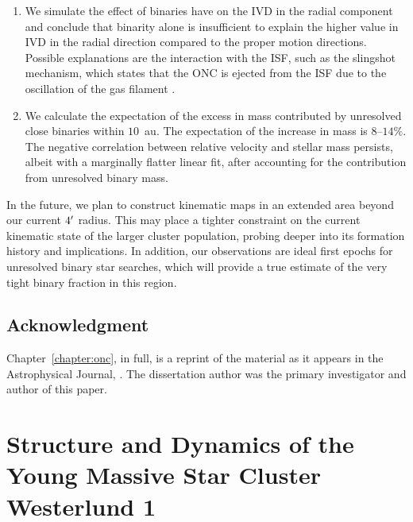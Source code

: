 \documentclass[12pt]{ucsddissertation}
\begin{document}
\begin{CJK*}{UTF8}{gbsn}
\begin{enumerate}
    \item We simulate the effect of binaries have on the IVD in the radial component and conclude that binarity alone is insufficient to explain the higher value in IVD in the radial direction compared to the proper motion directions. Possible explanations are the interaction with the ISF, such as the slingshot mechanism, which states that the ONC is ejected from the ISF due to the oscillation of the gas filament \citep[][]{Stutz-2016, Stutz-2018, Matus-2023}.

    \item We calculate the expectation of the excess in mass contributed by unresolved close binaries within $10$~au. The expectation of the increase in mass is $8$--$14\%$. The negative correlation between relative velocity and stellar mass persists, albeit with a marginally flatter linear fit, after accounting for the contribution from unresolved binary mass. 

\end{enumerate}


In the future, we plan to construct kinematic maps in an extended area beyond our current $4\mbox{$^\prime$}$ radius. This may place a tighter constraint on the current kinematic state of the larger cluster population, probing deeper into its formation history and implications. In addition, our observations are ideal first epochs for unresolved binary star searches, which will provide a true estimate of the very tight binary fraction in this region.




\section*{Acknowledgment}
Chapter~\ref{chapter:onc}, in full, is a reprint of the material as it appears in the Astrophysical Journal, \citealt*{Wei-2024}. The dissertation author was the primary investigator and author of this paper.

\chapter{Structure and Dynamics of the Young Massive Star Cluster Westerlund 1}
\label{chapter:wd1}


\end{CJK*}
\end{document}
